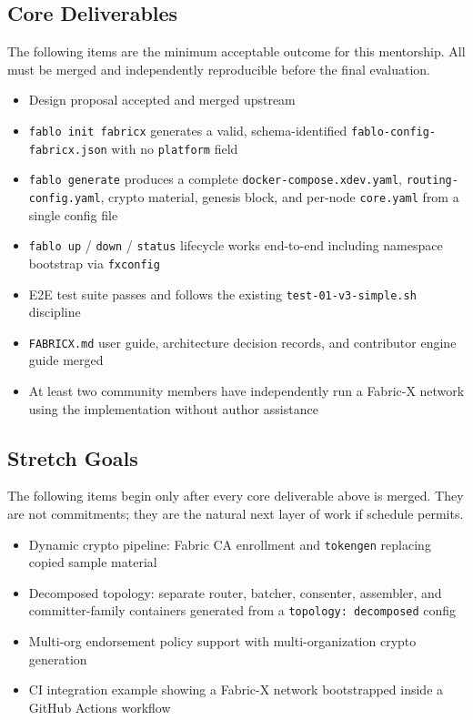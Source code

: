 \subsection*{Core Deliverables}

The following items are the minimum acceptable outcome
for this mentorship. All must be merged and independently
reproducible before the final evaluation.

\begin{itemize}[leftmargin=2em]
  \item[\checkmark] Design proposal accepted and merged upstream
  \item[\checkmark] \texttt{fablo init fabricx} generates a
        valid, schema-identified \texttt{fablo-config-fabricx.json}
        with no \texttt{platform} field
  \item[\checkmark] \texttt{fablo generate} produces a complete
        \texttt{docker-compose.xdev.yaml}, \texttt{routing-config.yaml},
        crypto material, genesis block, and per-node
        \texttt{core.yaml} from a single config file
  \item[\checkmark] \texttt{fablo up} / \texttt{down} /
        \texttt{status} lifecycle works end-to-end including
        namespace bootstrap via \texttt{fxconfig}
  \item[\checkmark] E2E test suite passes and follows the
        existing \texttt{test-01-v3-simple.sh} discipline
  \item[\checkmark] \texttt{FABRICX.md} user guide, architecture
        decision records, and contributor engine guide merged
  \item[\checkmark] At least two community members have
        independently run a Fabric-X network using the
        implementation without author assistance
\end{itemize}

\subsection*{Stretch Goals}

The following items begin only after every core deliverable
above is merged. They are not commitments; they are the
natural next layer of work if schedule permits.

\begin{itemize}[leftmargin=2em]
  \item Dynamic crypto pipeline: Fabric CA enrollment and
        \texttt{tokengen} replacing copied sample material
  \item Decomposed topology: separate router, batcher,
        consenter, assembler, and committer-family containers
        generated from a \texttt{topology: decomposed} config
  \item Multi-org endorsement policy support with
        multi-organization crypto generation
  \item CI integration example showing a Fabric-X network
        bootstrapped inside a GitHub Actions workflow
\end{itemize}
\newpage

